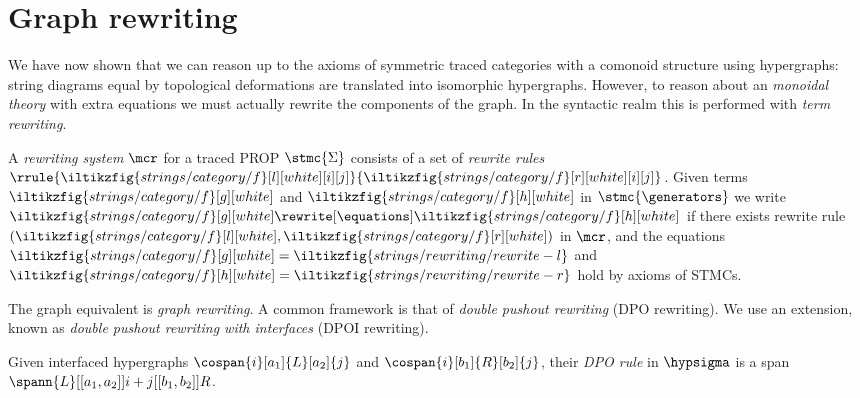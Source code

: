 \section{Graph rewriting}

We have now shown that we can reason up to the axioms of symmetric traced
categories with a comonoid structure using hypergraphs: string diagrams equal by
topological deformations are translated into isomorphic hypergraphs.
However, to reason about an \emph{monoidal theory} with extra equations we must
actually rewrite the components of the graph.
In the syntactic realm this is performed with \emph{term rewriting}.

\begin{definition}\label{def:term-rewriting}
    A \emph{rewriting system} \(\mcr\) for a traced PROP \(\stmc{\Sigma}\)
    consists of a set of \emph{rewrite rules} \(
        \rrule{
            \iltikzfig{strings/category/f}[l][white][i][j]
        }{
            \iltikzfig{strings/category/f}[r][white][i][j]
        }
    \).
    Given terms \(
        \iltikzfig{strings/category/f}[g][white]
    \) and \(
        \iltikzfig{strings/category/f}[h][white]
    \) in \(\stmc{\generators}\) we write \(
        \iltikzfig{strings/category/f}[g][white]
        \rewrite[\equations]
        \iltikzfig{strings/category/f}[h][white]
    \) if there exists rewrite rule \((
        \iltikzfig{strings/category/f}[l][white],
        \iltikzfig{strings/category/f}[r][white]
    )\) in \(\mcr\), and the equations \(
        \iltikzfig{strings/category/f}[g][white]
        =
        \iltikzfig{strings/rewriting/rewrite-l}
    \) and \(
        \iltikzfig{strings/category/f}[h][white]
        =
        \iltikzfig{strings/rewriting/rewrite-r}
    \) hold by axioms of STMCs.
\end{definition}

The graph equivalent is \emph{graph rewriting}.
A common framework is that of \emph{double pushout rewriting} (DPO rewriting).
We use an extension, known as \emph{double pushout rewriting with interfaces}
(DPOI rewriting).

\begin{definition}
    Given interfaced hypergraphs \(
        \cospan{i}[a_1]{L}[a_2]{j}
    \) and \(
        \cospan{i}[b_1]{R}[b_2]{j}
    \), their \emph{DPO rule} in \(\hypsigma\) is a span \(
        \spann{L}[[a_1,a_2]]{i+j}[[b_1,b_2]]{R}
    \).
\end{definition}

